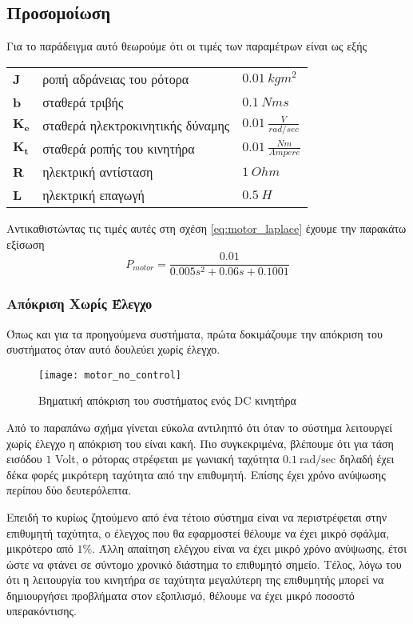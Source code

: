 \subsection{Προσομοίωση}

Για το παράδειγμα αυτό θεωρούμε ότι οι τιμές των παραμέτρων είναι ως εξής
\begin{flushleft}
\begin{tabular}{lll}
\textbf{J} & ροπή αδράνειας του ρότορα & $0.01\ kgm^2$ \\ 
\textbf{b} & σταθερά τριβής & $0.1\ Nms$ \\  
$\mathbf{K_e}$ & σταθερά ηλεκτροκινητικής δύναμης & $0.01\ \frac{V}{rad/sec}$ \\  
$\mathbf{K_t}$ & σταθερά ροπής του κινητήρα & $0.01\ \frac{Nm}{Ampere}$ \\  
\textbf{R} & ηλεκτρική αντίσταση & $1\ Ohm$ \\ 
\textbf{L} & ηλεκτρική επαγωγή & $0.5\ H$ \\ 
\end{tabular} 
\end{flushleft}

Αντικαθιστώντας τις τιμές αυτές στη σχέση \ref{eq:motor_laplace} έχουμε την παρακάτω εξίσωση
\begin{equation}
P_{motor} = \frac{0.01}{0.005s^2+0.06s+0.1001}
\end{equation}

\subsubsection{Απόκριση Χωρίς Έλεγχο}

Όπως και για τα προηγούμενα συστήματα, πρώτα δοκιμάζουμε την απόκριση του συστήματος όταν αυτό δουλεύει χωρίς έλεγχο.
\begin{figure}[h]
  \centering
  \texttt{[image: motor\_no\_control]}
  \caption{Βηματική απόκριση του συστήματος ενός DC κινητήρα}
  \label{fig:motor_no_control}
\end{figure}
Από το παραπάνω σχήμα γίνεται εύκολα αντιληπτό ότι όταν το σύστημα λειτουργεί χωρίς έλεγχο η απόκριση του είναι κακή. Πιο συγκεκριμένα, βλέπουμε ότι για τάση εισόδου $1$ Volt, ο ρότορας στρέφεται με γωνιακή ταχύτητα $0.1\ \text{rad/sec}$ δηλαδή έχει δέκα φορές μικρότερη ταχύτητα από την επιθυμητή. Επίσης έχει χρόνο ανύψωσης περίπου δύο δευτερόλεπτα.

Επειδή το κυρίως ζητούμενο από ένα τέτοιο σύστημα είναι να περιστρέφεται στην επιθυμητή ταχύτητα, ο έλεγχος που θα εφαρμοστεί θέλουμε να έχει μικρό σφάλμα, μικρότερο από $1\%$. Άλλη απαίτηση ελέγχου είναι να έχει μικρό χρόνο ανύψωσης, έτσι ώστε να φτάνει σε σύντομο χρονικό διάστημα το επιθυμητό σημείο. Τέλος, λόγω του ότι η λειτουργία του κινητήρα σε ταχύτητα μεγαλύτερη της επιθυμητής μπορεί να δημιουργήσει προβλήματα στον εξοπλισμό, θέλουμε να έχει μικρό ποσοστό υπερακόντισης.

